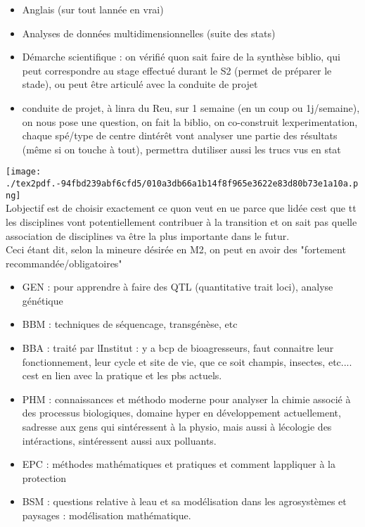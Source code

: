 \documentclass[
]{article}
\providecommand{\tightlist}{%
  \setlength{\itemsep}{0pt}\setlength{\parskip}{0pt}}
\begin{document}
\begin{itemize}
\tightlist
\item
  Anglais (sur tout l\textquotesingle année en vrai)
\item
  Analyses de données multidimensionnelles (suite des stats)
\item
  Démarche scientifique : on vérifié qu\textquotesingle on sait faire de
  la synthèse biblio, qui peut correspondre au stage effectué durant le
  S2 (permet de préparer le stade), ou peut être articulé avec la
  conduite de projet
\item
  conduite de projet, à l\textquotesingle inra du Reu, sur 1 semaine (en
  un coup ou 1j/semaine), on nous pose une question, on fait la biblio,
  on co-construit l\textquotesingle experimentation, chaque spé/type de
  centre d\textquotesingle intérêt vont analyser une partie des
  résultats (même si on touche à tout), permettra
  d\textquotesingle utiliser aussi les trucs vus en stat
\end{itemize}

\texttt{[image: ./tex2pdf.-94fbd239abf6cfd5/010a3db66a1b14f8f965e3622e83d80b73e1a10a.png]}\\
L\textquotesingle objectif est de choisir exactement ce
qu\textquotesingle on veut en ue parce que l\textquotesingle idée
c\textquotesingle est que tt les disciplines vont potentiellement
contribuer à la transition et on sait pas quelle association de
disciplines va être la plus importante dans le futur.\\
Ceci étant dit, selon la mineure désirée en M2, on peut en avoir des
"fortement recommandée/obligatoires"

\begin{itemize}
\tightlist
\item
  GEN : pour apprendre à faire des QTL (quantitative trait loci),
  analyse génétique
\item
  BBM : techniques de séquencage, transgénèse, etc
\item
  BBA : traité par l\textquotesingle Institut : y a bcp de
  bioagresseurs, faut connaitre leur fonctionnement, leur cycle et site
  de vie, que ce soit champis, insectes, etc.... c\textquotesingle est
  en lien avec la pratique et les pbs actuels.
\item
  PHM : connaissances et méthodo moderne pour analyser la chimie associé
  à des processus biologiques, domaine hyper en développement
  actuellement, s\textquotesingle adresse aux gens qui
  s\textquotesingle intéressent à la physio, mais aussi à
  l\textquotesingle écologie des intéractions,
  s\textquotesingle intéressent aussi aux polluants.
\item
  EPC : méthodes mathématiques et pratiques et comment
  l\textquotesingle appliquer à la protection
\item
  BSM : questions relative à l\textquotesingle eau et sa modélisation
  dans les agrosystèmes et paysages : modélisation mathématique.
\end{itemize}
\end{document}
